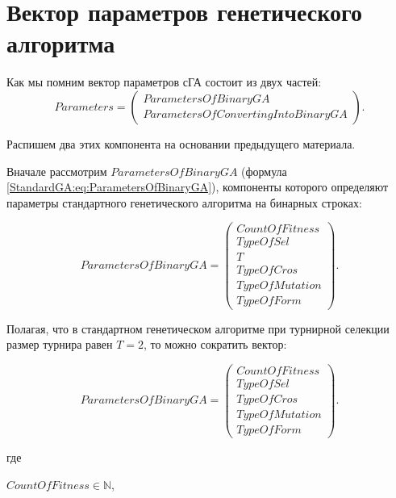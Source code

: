 \chapter{Вектор параметров генетического алгоритма}\label{StandardGA:section_ParametersGA}

Как мы помним вектор параметров сГА состоит из двух частей:
\begin{equation}
\label{StandardGA:eq:Parameters}
Parameters =\left( \begin{array}{c}ParametersOfBinaryGA\\ParametersOfConvertingIntoBinaryGA
\end{array}\right) .
\end{equation}

Распишем два этих компонента на основании предыдущего материала.

Вначале рассмотрим $ ParametersOfBinaryGA $ (формула \ref{StandardGA:eq:ParametersOfBinaryGA}), компоненты которого определяют параметры стандартного генетического алгоритма на бинарных строках:

\begin{equation*}
\label{StandardGA:eq:ParametersOfBinaryGA2}
ParametersOfBinaryGA=  \left( \begin{array}{c} CountOfFitness \\ TypeOfSel \\ T \\ TypeOfCros \\ TypeOfMutation\\TypeOfForm \end{array}\right).
\end{equation*}

Полагая, что в стандартном генетическом алгоритме при турнирной селекции размер турнира равен $ T=2 $, то можно сократить вектор:

\begin{equation}
\label{StandardGA:eq:ParametersOfBinaryGA3}
ParametersOfBinaryGA=  \left( \begin{array}{c} CountOfFitness \\ TypeOfSel \\ TypeOfCros \\ TypeOfMutation\\TypeOfForm \end{array}\right).
\end{equation}

где 

$ CountOfFitness \in \mathbb{N}$,

